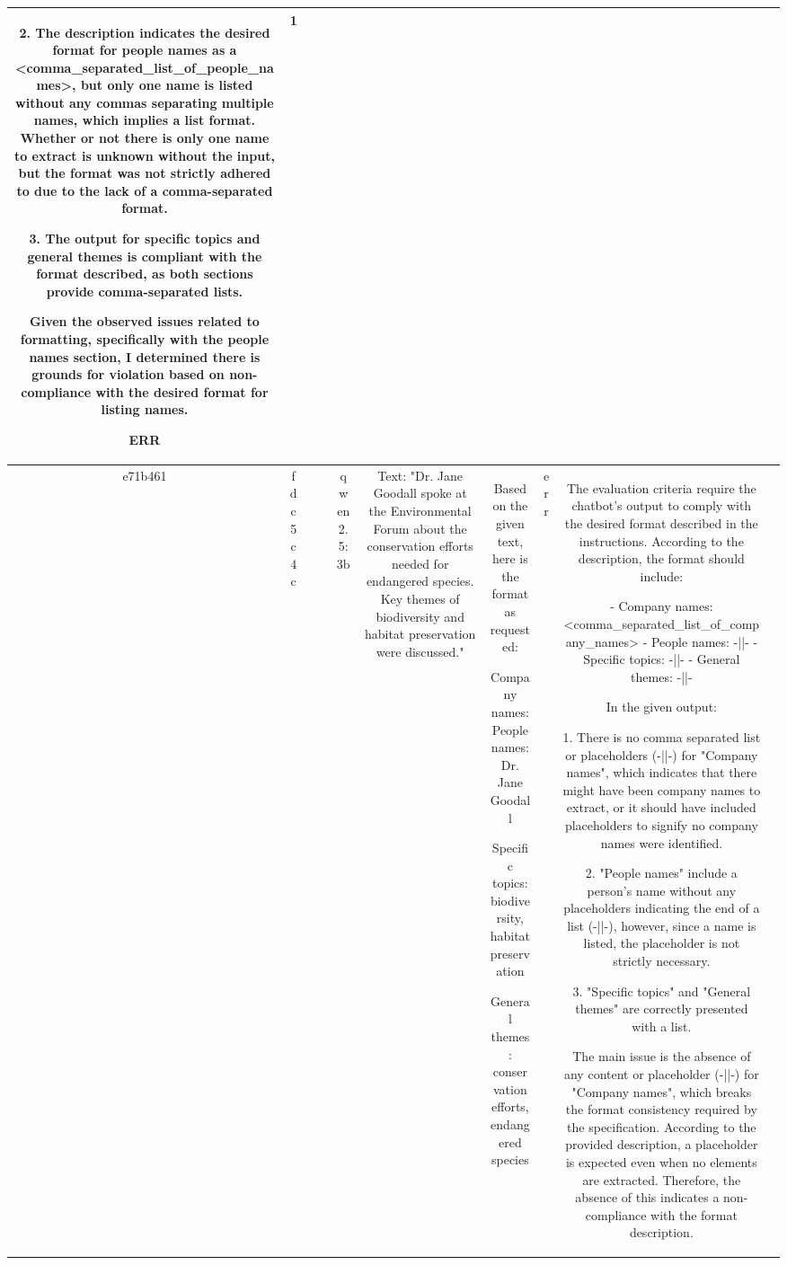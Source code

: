 \begin{table}[h!]
\begin{tabular}{|c|c|c|c|c|c|c|c|c|c|}
2. The description indicates the desired format for people names as a <comma_separated_list_of_people_names>, but only one name is listed without any commas separating multiple names, which implies a list format. Whether or not there is only one name to extract is unknown without the input, but the format was not strictly adhered to due to the lack of a comma-separated format.

3. The output for specific topics and general themes is compliant with the format described, as both sections provide comma-separated lists.

Given the observed issues related to formatting, specifically with the people names section, I determined there is grounds for violation based on non-compliance with the desired format for listing names.

ERR & 1\\
\hline
e71b461 & fdc5c4c &  &  & qwen2.5:3b & Text: "Dr. Jane Goodall spoke at the Environmental Forum about the conservation efforts needed for endangered species. Key themes of biodiversity and habitat preservation were discussed." & Based on the given text, here is the format as requested:

Company names: 
People names: Dr. Jane Goodall

Specific topics: biodiversity, habitat preservation

General themes: conservation efforts, endangered species & err & The evaluation criteria require the chatbot's output to comply with the desired format described in the instructions. According to the description, the format should include:

- Company names: <comma_separated_list_of_company_names>
- People names: -||-
- Specific topics: -||-
- General themes: -||-

In the given output:

1. There is no comma separated list or placeholders (-||-) for "Company names", which indicates that there might have been company names to extract, or it should have included placeholders to signify no company names were identified.

2. "People names" include a person’s name without any placeholders indicating the end of a list (-||-), however, since a name is listed, the placeholder is not strictly necessary.

3. "Specific topics" and "General themes" are correctly presented with a list.

The main issue is the absence of any content or placeholder (-||-) for "Company names", which breaks the format consistency required by the specification. According to the provided description, a placeholder is expected even when no elements are extracted. Therefore, the absence of this indicates a non-compliance with the format description.


\end{tabular}
\end{table}
